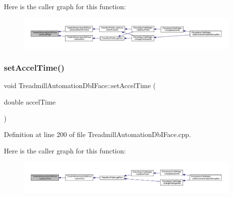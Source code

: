 Here is the caller graph for this function\+:
\nopagebreak
\begin{figure}[H]
\begin{center}
\leavevmode
\includegraphics[width=350pt]{class_treadmill_automation_db_i_face_a8c58d70ef6116fca1ca12357dece5511_icgraph}
\end{center}
\end{figure}
\mbox{\label{class_treadmill_automation_db_i_face_aa9419917bab8f262b1a058340dbf4570}} 
\subsubsection{\texorpdfstring{set\+Accel\+Time()}{setAccelTime()}}
{\footnotesize\ttfamily void Treadmill\+Automation\+Db\+I\+Face\+::set\+Accel\+Time (\begin{DoxyParamCaption}\item[{double}]{accel\+Time }\end{DoxyParamCaption})}



Definition at line 200 of file Treadmill\+Automation\+Db\+I\+Face.\+cpp.

Here is the caller graph for this function\+:
\nopagebreak
\begin{figure}[H]
\begin{center}
\leavevmode
\includegraphics[width=350pt]{class_treadmill_automation_db_i_face_aa9419917bab8f262b1a058340dbf4570_icgraph}
\end{center}
\end{figure}
\mbox{\label{class_treadmill_automation_db_i_face_a8d7f60d12325634c978ea98075feb924}} 
